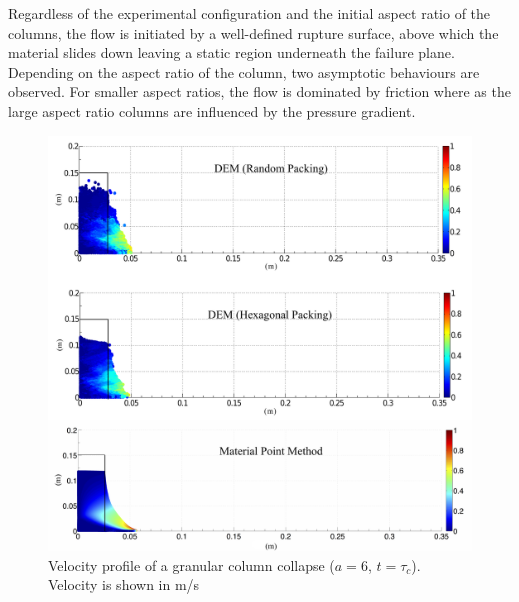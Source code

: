 Regardless of the experimental configuration and the initial aspect ratio of 
the columns, the flow is initiated by a well-defined rupture surface, above 
which the material slides down leaving a static region underneath the failure 
plane. Depending on the aspect ratio of the column, two asymptotic behaviours 
are observed. For smaller aspect ratios, the flow is dominated by friction 
where as the large aspect ratio columns are influenced by the pressure gradient.

\begin{figure}[tbhp]
\centering
\includegraphics[width=\textwidth]{a6tc}
\caption[Velocity profile of a granular column collapse ($a = 6$,  
$t=\tau_c$).]{Velocity profile of a granular column collapse ($a = 6$,  
$t=\tau_c$). Velocity is shown in m/s}
\label{fig:a6tc}
\end{figure}

